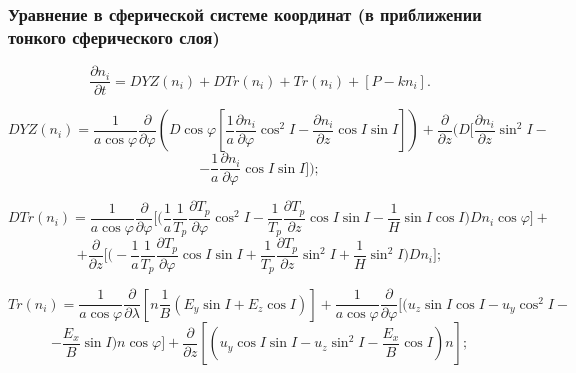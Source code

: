 \documentclass[9pt, apectratio=43,unicode]{beamer}
\begin{document}
\begin{frame}\frametitle{Уравнение в сферической системе координат (в приближении тонкого сферического слоя)}

$$\dfrac{\partial n_i}{\partial t} = DYZ(n_i)+DTr(n_i)+Tr(n_i)+[P-kn_i].$$

$$DYZ(n_i) = \dfrac{1}{a\cos\varphi}\dfrac{\partial}{\partial\varphi}\left(D\cos\varphi\left[\dfrac{1}{a}\dfrac{\partial n_i}{\partial\varphi} \cos^2 I -\dfrac{\partial n_i}{\partial z}\cos I\sin I\right]\right)+ \dfrac{\partial}{\partial z}\bigg(D\bigg[\dfrac{\partial n_i}{\partial z}\sin^2 I -$$ $$- \dfrac{1}{a}\dfrac{\partial n_i}{\partial\varphi}\cos I \sin I\bigg]\bigg);$$ 

$$DTr(n_i) = \dfrac{1}{a\cos\varphi}\dfrac{\partial}{\partial \varphi}\bigg[\bigg(\dfrac{1}{a}\dfrac{1}{T_p}\dfrac{\partial T_p}{\partial\varphi}\cos^2 I-\dfrac{1}{T_p}\dfrac{\partial T_p}{\partial z}\cos I \sin I - \dfrac{1}{H}\sin I \cos I\bigg)Dn_i\cos\varphi\bigg] +$$ $$+ \dfrac{\partial}{\partial z}\bigg[\bigg(-\dfrac{1}{a}\dfrac{1}{T_p}\dfrac{\partial T_p}{\partial \varphi}\cos I \sin I +\dfrac{1}{T_p}\dfrac{\partial T_p}{\partial z}\sin^2 I+\dfrac{1}{H}\sin^2I\bigg)Dn_i\bigg];$$

$$Tr(n_i) = \dfrac{1}{a\cos\varphi}\dfrac{\partial}{\partial\lambda}\left[n\dfrac{1}{B}(E_y\sin I + E_z\cos I)\right]+\dfrac{1}{a\cos\varphi}\dfrac{\partial}{\partial\varphi}\bigg[\bigg(u_z\sin I \cos I - u_y\cos^2 I -$$ $$- \dfrac{E_x}{B}\sin I\bigg)n\cos\varphi\bigg]+\dfrac{\partial}{\partial z}\left[\left(u_y\cos I \sin I -u_z\sin^2 I - \dfrac{E_x}{B}\cos I\right)n\right];$$

\end{frame}
\end{document}
